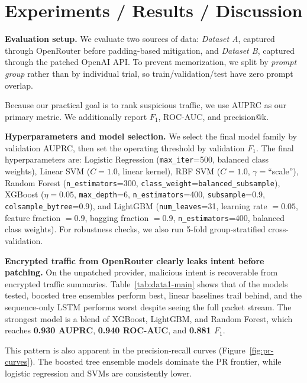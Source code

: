 \section{Experiments / Results / Discussion}

\textbf{Evaluation setup.}
We evaluate two sources of data: \emph{Dataset A}, captured through OpenRouter before padding-based mitigation, and \emph{Dataset B}, captured through the patched OpenAI API. To prevent memorization, we split by \emph{prompt group} rather than by individual trial, so train/validation/test have zero prompt overlap. 

Because our practical goal is to rank suspicious traffic, we use AUPRC as our primary metric. We additionally report $F_1$, ROC-AUC, and precision@k.

\textbf{Hyperparameters and model selection.}
We select the final model family by validation AUPRC, then set the operating threshold by validation $F_1$. The final hyperparameters are: Logistic Regression (\texttt{max\_iter}=500, balanced class weights), Linear SVM (\(C=1.0\), linear kernel), RBF SVM (\(C=1.0\), \(\gamma=\)``scale''), Random Forest (\texttt{n\_estimators}=300, \texttt{class\_weight}=\texttt{balanced\_subsample}), XGBoost (\(\eta=0.05\), \texttt{max\_depth}=6, \texttt{n\_estimators}=400, \texttt{subsample}=0.9, \texttt{colsample\_bytree}=0.9), and LightGBM (\texttt{num\_leaves}=31, learning rate \(=0.05\), feature fraction \(=0.9\), bagging fraction \(=0.9\), \texttt{n\_estimators}=400, balanced class weights). For robustness checks, we also run 5-fold group-stratified cross-validation.

\textbf{Encrypted traffic from OpenRouter clearly leaks intent before patching.}
On the unpatched provider, malicious intent is recoverable from encrypted traffic summaries. Table~\ref{tab:data1-main} shows that of the models tested, boosted tree ensembles perform best, linear baselines trail behind, and the sequence-only LSTM performs worst despite seeing the full packet stream. The strongest model is a blend of XGBoost, LightGBM, and Random Forest, which reaches \textbf{0.930 AUPRC}, \textbf{0.940 ROC-AUC}, and \textbf{0.881 $F_1$}. 

This pattern is also apparent in the precision-recall curves (Figure~\ref{fig:pr-curves}). The boosted tree ensemble models dominate the PR frontier, while logistic regression and SVMs are consistently lower. 

